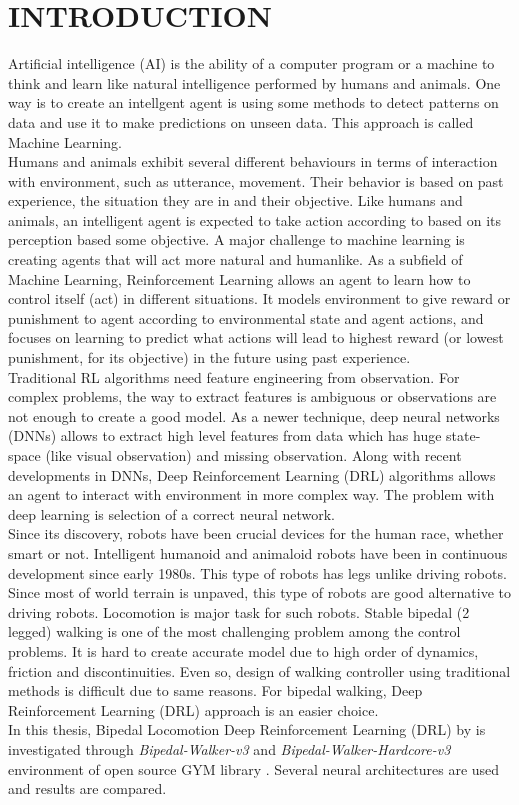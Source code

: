 \chapter{INTRODUCTION}
\label{chap:intro}
Artificial intelligence (AI) is the ability of a computer program or a machine to think and learn like natural intelligence performed by humans and animals.  One way is to create an intellgent agent is using some methods to detect patterns on data and use it to make predictions on unseen data. This approach is called Machine Learning.  \\
Humans and animals exhibit several different behaviours in terms of interaction with environment, such as utterance, movement. Their behavior is based on past experience, the situation they are in and their objective. Like humans and animals, an intelligent agent is expected to take action according to based on its perception based some objective. A major challenge to machine learning is creating agents that will act more natural and humanlike. As a subfield of Machine Learning, Reinforcement Learning allows an agent to learn how to control itself (act) in different situations. It models environment to give reward or punishment to agent according to environmental state and agent actions, and focuses on learning to predict what actions will lead to highest reward (or lowest punishment, for its objective) in the future using past experience. \\
Traditional RL algorithms need feature engineering from observation. For complex problems, the way to extract features is ambiguous or observations are not enough to create a good model. As a newer technique, deep neural networks (DNNs) allows to extract high level features from data which has huge state-space (like visual observation) and missing observation. Along with recent developments in DNNs, Deep Reinforcement Learning (DRL) algorithms allows an agent to interact with environment in more complex way. The problem with deep learning is selection of a correct neural network. \\
Since its discovery, robots have been crucial devices for the human race, whether smart or not. Intelligent humanoid and animaloid robots have been in continuous development since early 1980s. This type of robots has legs unlike driving robots. Since most of world terrain is unpaved, this type of robots are good alternative to driving robots. Locomotion is major task for such robots. Stable bipedal (2 legged) walking is one of the most challenging problem among the control problems. It is hard to create accurate model due to high order of dynamics, friction and discontinuities. Even so, design of walking controller using traditional methods is difficult due to same reasons. For bipedal walking, Deep Reinforcement Learning (DRL) approach is an easier choice. \\
In this thesis, Bipedal Locomotion Deep Reinforcement Learning (DRL) by is investigated through \textit{Bipedal-Walker-v3} \cite{noauthor_bipedalwalker-v2_2021} and \textit{Bipedal-Walker-Hardcore-v3} \cite{noauthor_bipedalwalkerhardcore-v2_2021} environment of open source GYM library \cite{brockman_openai_2016}. Several neural architectures are used and results are compared. 